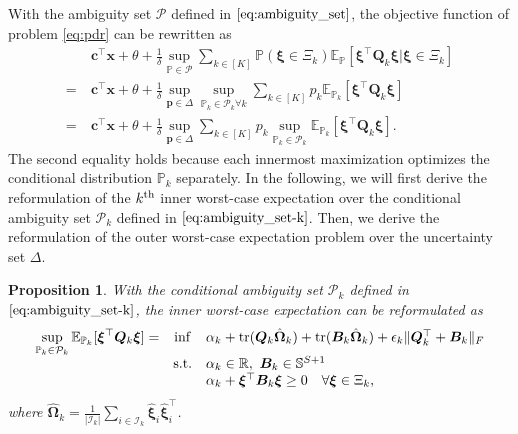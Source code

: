 \documentclass{article}
\newcommand{\st}{\textnormal{s.t.}}
\newcommand{\PP}{\mathbb{P}}
\newcommand{\EE}{\mathbb{E}}
\newcommand{\RR}{\mathbb{R}}
\newcommand{\tr}{\textup{tr}}
\newtheorem{proposition}{Proposition}
\begin{document}
With the ambiguity set $\mathcal{P}$ defined in $\eqref{eq:ambiguity_set}$, the objective function of problem \eqref{eq:pdr} can be rewritten as 
\begin{align}
& \bm c^\top \bm x + \theta + \frac{1}{\delta} \displaystyle \sup_{\PP\in\mathcal P} \sum_{k \in [K]} \PP(\bm \xi \in \Xi_k) \EE_\PP [\bm \xi^\top \bm Q_k \bm\xi | \bm\xi \in \Xi_k] \nonumber  \\
= \ & \bm c^\top \bm x + \theta + \frac{1}{\delta} \displaystyle \sup_{\bm p \in \Delta}  \sup_{\PP_k \in \mathcal{P}_k \forall k} \sum_{k \in [K]} p_k \EE_{\PP_k} [\bm \xi^\top \bm Q_k \bm\xi] \nonumber \\
= \ &  \bm c^\top \bm x + \theta + \frac{1}{\delta} \displaystyle \sup_{\bm p \in \Delta} \sum_{k \in [K]}  p_k \sup_{\PP_k \in \mathcal{P}_k}  \EE_{\PP_k} [\bm \xi^\top \bm Q_k \bm\xi].\label{eq:pdr-obj}
\end{align}
The second equality holds because each innermost maximization optimizes the conditional distribution $\PP_k$ separately. %
In the following, we will first derive the reformulation of the $k^\textup{th}$ inner worst-case expectation over the conditional ambiguity set $\mathcal P_k$ defined in $\eqref{eq:ambiguity_set-k}$. Then, we derive the reformulation of the outer worst-case expectation problem over the uncertainty set $\Delta$.%
\begin{proposition}\label{prop2}
With the conditional ambiguity set $\mathcal P_k$ defined in $\eqref{eq:ambiguity_set-k}$, the inner worst-case expectation can be reformulated as
\begin{equation}
\label{eq:inner_ambiguity_set_ref}
\begin{array}{ccll}
\displaystyle \sup_{\PP_k \in \mathcal{P}_k}  \EE_{\PP_k} [\bm \xi^\top \bm Q_k \bm\xi] = & \displaystyle \inf & \alpha_k + \tr(\bm Q_k\hat{\bm\Omega}_k) + \tr(\bm B_k\hat{\bm\Omega}_k) + \epsilon_k\|\bm Q_k^\top + \bm B_k\|_F  \\
& \st & \alpha_k \in \RR, \ \bm B_k \in \mathbb{S}^{S+1}\\
& & \alpha_k + \bm \xi^\top \bm B_k \bm \xi \geq  0  \quad \forall \bm\xi \in \Xi_k,
\end{array}
\end{equation}
where $\hat{\bm \Omega}_k = \frac{1}{|\mathcal{I}_k|} \sum_{i \in \mathcal{I}_k} \hat{\bm \xi}_i \hat{\bm \xi}_i^\top$. %
\end{proposition}
\end{document}

